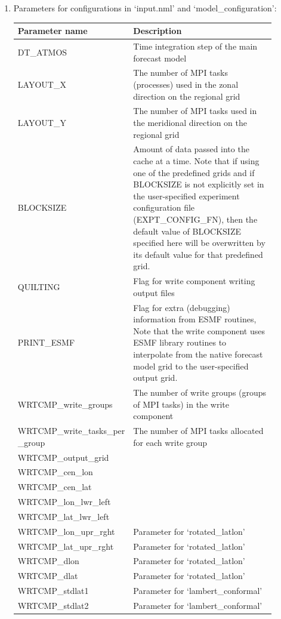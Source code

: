 \documentclass[11pt,fleqn]{report}              %
\begin{document}
\begin{enumerate}
\item Parameters for configurations in `input.nml' and `model\_configuration':
{
\scriptsize
\begin{longtable}{p{0.21\linewidth} | p{0.69\linewidth} }
\hline
\hline
Parameter name & Description \\
\hline
DT\_ATMOS & Time integration step of the main forecast model  \\
LAYOUT\_X & The number of MPI tasks (processes) used in the zonal direction on the regional grid  \\
LAYOUT\_Y & The number of MPI tasks used in the meridional direction on the regional grid \\
BLOCKSIZE & Amount of data passed into the cache at a time. Note that if using one of the predefined grids and if BLOCKSIZE is not explicitly set in the user-specified experiment configuration file (EXPT\_CONFIG\_FN), then the default value of BLOCKSIZE specified here will be overwritten by its default value for that predefined grid.  \\
QUILTING & Flag for write component writing output files \\
PRINT\_ESMF & Flag for extra (debugging) information from ESMF routines, Note that the write component uses ESMF library routines to interpolate from the native forecast model grid to the user-specified output grid. \\
WRTCMP\_write\_groups & The number of write groups (groups of MPI tasks) in the write component \\
WRTCMP\_write\_tasks\_per \_group & The number of MPI tasks allocated for each write group \\
WRTCMP\_output\_grid & \\
WRTCMP\_cen\_lon & \\
WRTCMP\_cen\_lat & \\
WRTCMP\_lon\_lwr\_left & \\
WRTCMP\_lat\_lwr\_left & \\
WRTCMP\_lon\_upr\_rght & Parameter for `rotated\_latlon' \\
WRTCMP\_lat\_upr\_rght & Parameter for `rotated\_latlon' \\
WRTCMP\_dlon & Parameter for `rotated\_latlon' \\
WRTCMP\_dlat & Parameter for `rotated\_latlon' \\
WRTCMP\_stdlat1 & Parameter for `lambert\_conformal' \\
WRTCMP\_stdlat2 & Parameter for `lambert\_conformal' \\

\end{longtable}}
\end{enumerate}
\end{document}
